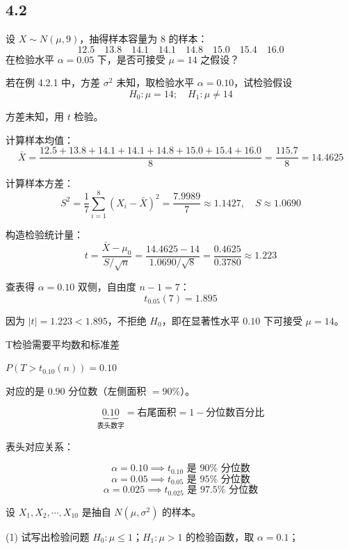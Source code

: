 \subsection{4.2}
\begin{homework}[1]
\begin{example}
设 $X \sim N(\mu, 9)$，抽得样本容量为 8 的样本：
$$12.5 \quad 13.8 \quad 14.1 \quad 14.1 \quad 14.8 \quad 15.0 \quad 15.4 \quad 16.0$$
在检验水平 $\alpha = 0.05$ 下，是否可接受 $\mu = 14$ 之假设？
\end{example}

若在例 4.2.1 中，方差 $\sigma^2$ 未知，取检验水平 $\alpha = 0.10$，试检验假设
$$H_0: \mu = 14; \quad H_1: \mu \neq 14$$
\end{homework}
\begin{solution}
方差未知，用 $t$ 检验。

计算样本均值：
$$\bar{X} = \frac{12.5+13.8+14.1+14.1+14.8+15.0+15.4+16.0}{8} = \frac{115.7}{8} = 14.4625$$

计算样本方差：
$$S^2 = \frac{1}{7}\sum_{i=1}^8(X_i-\bar{X})^2 = \frac{7.9989}{7} \approx 1.1427, \quad S \approx 1.0690$$

构造检验统计量：
$$t = \frac{\bar{X} - \mu_0}{S/\sqrt{n}} = \frac{14.4625 - 14}{1.0690/\sqrt{8}} = \frac{0.4625}{0.3780} \approx 1.223$$

查表得 $\alpha = 0.10$ 双侧，自由度 $n-1=7$：
$$t_{0.05}(7) = 1.895$$

因为 $|t| = 1.223 < 1.895$，不拒绝 $H_0$，即在显著性水平 $0.10$ 下可接受 $\mu = 14$。
\end{solution}
\begin{dxtips}
    T检验需要平均数和标准差
\end{dxtips}
\begin{note}
    $P(T > t_{0.10}(n)) = 0.10$

对应的是 $0.90$ 分位数（左侧面积 $= 90\%$）。

$$\underbrace{0.10}_{\text{表头数字}} = \text{右尾面积} = 1 - \text{分位数百分比}$$

表头对应关系：

$$\alpha = 0.10 \implies t_{0.10} \text{ 是 } 90\% \text{ 分位数}$$
$$\alpha = 0.05 \implies t_{0.05} \text{ 是 } 95\% \text{ 分位数}$$
$$\alpha = 0.025 \implies t_{0.025} \text{ 是 } 97.5\% \text{ 分位数}$$
\end{note}
\begin{homework}[2]
设 $X_1, X_2, \cdots, X_{10}$ 是抽自 $N(\mu, \sigma^2)$ 的样本。

(1) 试写出检验问题 $H_0: \mu \leq 1$；$H_1: \mu > 1$ 的检验函数，取 $\alpha = 0.1$；
\end{homework}
